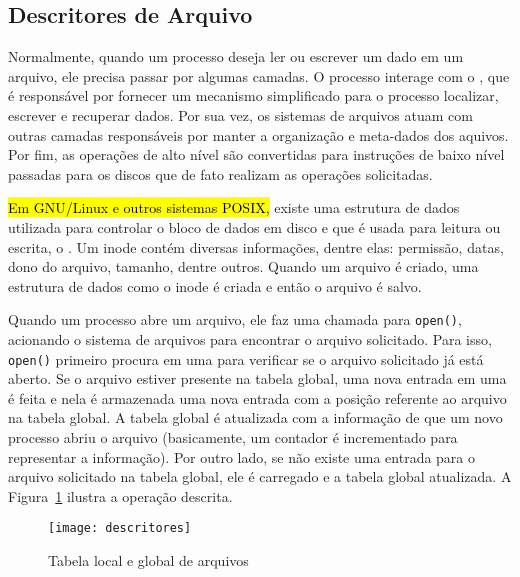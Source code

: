 \subsection{Descritores de Arquivo}

 Normalmente, quando um processo deseja ler ou escrever um
dado em um arquivo, ele precisa passar por algumas camadas. O
processo interage com o , que é responsável
por fornecer um mecanismo simplificado para o processo localizar, escrever e
recuperar dados. Por sua vez, os sistemas de arquivos atuam com outras camadas
responsáveis por manter a organização e meta-dados dos aquivos. Por fim,
as operações de alto nível são convertidas para instruções de baixo nível
passadas para os discos que de fato realizam as operações solicitadas.

\hl{Em GNU/Linux e outros sistemas POSIX,} existe uma estrutura de dados utilizada para controlar o bloco de dados em disco e que é
usada para leitura ou escrita, o . Um inode contém diversas
informações, dentre elas: permissão, datas, dono do arquivo, tamanho, dentre
outros. Quando um arquivo é criado, uma estrutura de dados como o inode é
criada e então o arquivo é salvo.

Quando um processo abre um arquivo, ele faz uma chamada para \texttt{open()},
acionando o sistema de arquivos para encontrar o arquivo solicitado.
Para isso, \texttt{open()} primeiro procura em uma  para verificar se o arquivo solicitado já está aberto. Se o
arquivo estiver presente na tabela global, uma nova entrada em uma
 é feita e nela é
armazenada uma nova entrada com a posição referente ao arquivo na tabela
global. A tabela global é atualizada com a informação de que um novo processo
abriu o arquivo (basicamente, um contador é incrementado para representar a
informação). Por outro lado, se não existe uma entrada para o arquivo solicitado
na tabela global, ele é carregado e a tabela global atualizada. A
Figura~\ref{fig:descritores} ilustra a operação descrita.
 
\begin{figure}[!h]
  \centering
  \texttt{[image: descritores]} 
  \caption{Tabela local e global de arquivos}
  \label{fig:descritores} 
\end{figure}

